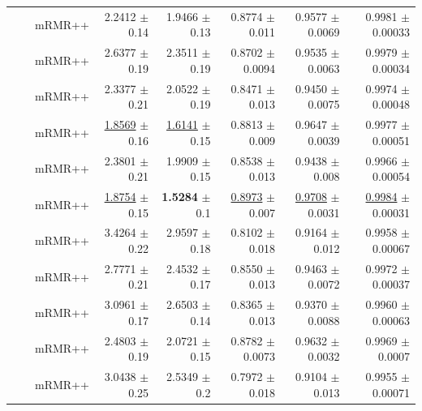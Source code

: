 \begin{longtable}{llp{}rrrrr}
 &  & mRMR++ & 2.2412 {\scriptsize $\pm$ 0.14} & 1.9466 {\scriptsize $\pm$ 0.13} & 0.8774 {\scriptsize $\pm$ 0.011} & 0.9577 {\scriptsize $\pm$ 0.0069} & 0.9981 {\scriptsize $\pm$ 0.00033} \\
 &  & mRMR++ & 2.6377 {\scriptsize $\pm$ 0.19} & 2.3511 {\scriptsize $\pm$ 0.19} & 0.8702 {\scriptsize $\pm$ 0.0094} & 0.9535 {\scriptsize $\pm$ 0.0063} & 0.9979 {\scriptsize $\pm$ 0.00034} \\
 &  & mRMR++ & 2.3377 {\scriptsize $\pm$ 0.21} & 2.0522 {\scriptsize $\pm$ 0.19} & 0.8471 {\scriptsize $\pm$ 0.013} & 0.9450 {\scriptsize $\pm$ 0.0075} & 0.9974 {\scriptsize $\pm$ 0.00048} \\
 &  & mRMR++ & \underline{1.8569} {\scriptsize $\pm$ 0.16} & \underline{1.6141} {\scriptsize $\pm$ 0.15} & 0.8813 {\scriptsize $\pm$ 0.009} & 0.9647 {\scriptsize $\pm$ 0.0039} & 0.9977 {\scriptsize $\pm$ 0.00051} \\
 &  & mRMR++ & 2.3801 {\scriptsize $\pm$ 0.21} & 1.9909 {\scriptsize $\pm$ 0.15} & 0.8538 {\scriptsize $\pm$ 0.013} & 0.9438 {\scriptsize $\pm$ 0.008} & 0.9966 {\scriptsize $\pm$ 0.00054} \\
 &  & mRMR++ & \underline{1.8754} {\scriptsize $\pm$ 0.15} & \textbf{1.5284} {\scriptsize $\pm$ 0.1} & \underline{0.8973} {\scriptsize $\pm$ 0.007} & \underline{0.9708} {\scriptsize $\pm$ 0.0031} & \underline{0.9984} {\scriptsize $\pm$ 0.00031} \\
 &  & mRMR++ & 3.4264 {\scriptsize $\pm$ 0.22} & 2.9597 {\scriptsize $\pm$ 0.18} & 0.8102 {\scriptsize $\pm$ 0.018} & 0.9164 {\scriptsize $\pm$ 0.012} & 0.9958 {\scriptsize $\pm$ 0.00067} \\
 &  & mRMR++ & 2.7771 {\scriptsize $\pm$ 0.21} & 2.4532 {\scriptsize $\pm$ 0.17} & 0.8550 {\scriptsize $\pm$ 0.013} & 0.9463 {\scriptsize $\pm$ 0.0072} & 0.9972 {\scriptsize $\pm$ 0.00037} \\
 &  & mRMR++ & 3.0961 {\scriptsize $\pm$ 0.17} & 2.6503 {\scriptsize $\pm$ 0.14} & 0.8365 {\scriptsize $\pm$ 0.013} & 0.9370 {\scriptsize $\pm$ 0.0088} & 0.9960 {\scriptsize $\pm$ 0.00063} \\
 &  & mRMR++ & 2.4803 {\scriptsize $\pm$ 0.19} & 2.0721 {\scriptsize $\pm$ 0.15} & 0.8782 {\scriptsize $\pm$ 0.0073} & 0.9632 {\scriptsize $\pm$ 0.0032} & 0.9969 {\scriptsize $\pm$ 0.0007} \\
 &  & mRMR++ & 3.0438 {\scriptsize $\pm$ 0.25} & 2.5349 {\scriptsize $\pm$ 0.2} & 0.7972 {\scriptsize $\pm$ 0.018} & 0.9104 {\scriptsize $\pm$ 0.013} & 0.9955 {\scriptsize $\pm$ 0.00071} \\

\end{longtable}
